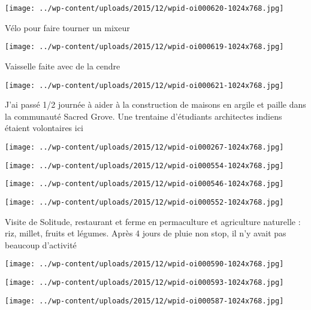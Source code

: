 \centerline{\texttt{[image: ../wp-content/uploads/2015/12/wpid-oi000620-1024x768.jpg]} } 
 \newline
 Vélo pour faire tourner un mixeur \newline
 \newline
\centerline{\texttt{[image: ../wp-content/uploads/2015/12/wpid-oi000619-1024x768.jpg]} } 
 \newline
 Vaisselle faite avec de la cendre \newline
 \newline
\centerline{\texttt{[image: ../wp-content/uploads/2015/12/wpid-oi000621-1024x768.jpg]} } 
 \newline
 J'ai passé 1/2 journée à aider à la construction de maisons en argile et paille dans la communauté Sacred Grove. Une trentaine d'étudiants architectes indiens étaient volontaires ici \newline
 \newline
\centerline{\texttt{[image: ../wp-content/uploads/2015/12/wpid-oi000267-1024x768.jpg]} } 
 \newline
 \newline
\centerline{\texttt{[image: ../wp-content/uploads/2015/12/wpid-oi000554-1024x768.jpg]} } 
 \newline
 \newline
\centerline{\texttt{[image: ../wp-content/uploads/2015/12/wpid-oi000546-1024x768.jpg]} } 
 \newline
 \newline
\centerline{\texttt{[image: ../wp-content/uploads/2015/12/wpid-oi000552-1024x768.jpg]} } 
 \newline
 Visite de Solitude, restaurant et ferme en permaculture et agriculture naturelle : riz, millet, fruits et légumes. Après 4 jours de pluie non stop, il n'y avait pas beaucoup d'activité \newline
 \newline
\centerline{\texttt{[image: ../wp-content/uploads/2015/12/wpid-oi000590-1024x768.jpg]} } 
 \newline
 \newline
\centerline{\texttt{[image: ../wp-content/uploads/2015/12/wpid-oi000593-1024x768.jpg]} } 
 \newline
 \newline
\centerline{\texttt{[image: ../wp-content/uploads/2015/12/wpid-oi000587-1024x768.jpg]} } 
 \newline

\newpage
 
